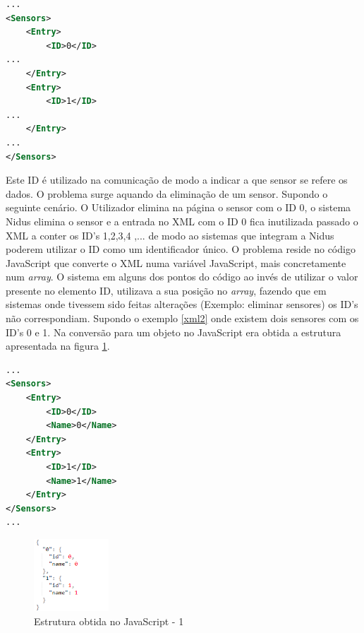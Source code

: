 \begin{lstlisting}[caption=Estrutura parcial do XML da Nidus(Sensores),label={xml1},language=XML]
...
<Sensors>
    <Entry>
        <ID>0</ID>
...
    </Entry>
    <Entry>
        <ID>1</ID>
...
    </Entry>
...
</Sensors>
\end{lstlisting}




\par Este ID é utilizado na comunicação de modo a indicar a que sensor se refere os dados. O problema surge aquando da eliminação de um sensor. Supondo o seguinte cenário. O Utilizador elimina na página o sensor com o ID 0, o sistema Nidus elimina o sensor e a entrada no XML com o ID 0 fica inutilizada passado o XML a conter os ID's 1,2,3,4 ,... de modo ao sistemas que integram a Nidus poderem utilizar o ID como um identificador único. O problema reside no código JavaScript que converte o XML numa variável JavaScript, mais concretamente num \textit{array}. O sistema em alguns dos pontos do código ao invés de utilizar o valor presente no elemento ID, utilizava a sua posição no \textit{array}, fazendo que em sistemas onde tivessem sido feitas alterações (Exemplo: eliminar sensores) os ID's não correspondiam. Supondo o exemplo \ref{xml2} onde existem dois sensores com os ID's 0 e 1. Na conversão para um objeto no JavaScript era obtida a estrutura apresentada na figura \ref{estruct1}.

\begin{lstlisting}[caption=Exemplo do XML antes da eliminação de Sensores,label={xml2},language=XML]
...
<Sensors>
    <Entry>
        <ID>0</ID>
        <Name>0</Name>
    </Entry>
    <Entry>
        <ID>1</ID>
        <Name>1</Name>
    </Entry>
</Sensors>
...
\end{lstlisting}

\begin{figure}[ht]
\centering
\includegraphics[width=0.25\textwidth]{images/estructu1.png}
\caption{Estrutura obtida no JavaScript - 1}\label{estruct1}
\end{figure}

